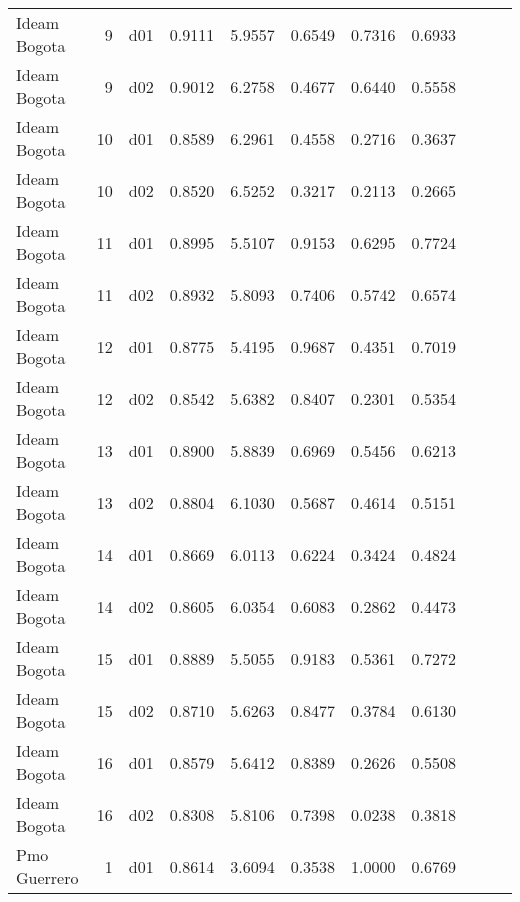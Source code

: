\begin{landscape}
\begin{longtable}{p{2cm}rrrrrrrrrr}
            Ideam Bogota  &          9 &     d01 &   0.9111 &  5.9557 &        0.6549 &           0.7316 &  0.6933 \\
            Ideam Bogota  &          9 &     d02 &   0.9012 &  6.2758 &        0.4677 &           0.6440 &  0.5558 \\
            Ideam Bogota  &         10 &     d01 &   0.8589 &  6.2961 &        0.4558 &           0.2716 &  0.3637 \\
            Ideam Bogota  &         10 &     d02 &   0.8520 &  6.5252 &        0.3217 &           0.2113 &  0.2665 \\
            Ideam Bogota  &         11 &     d01 &   0.8995 &  5.5107 &        0.9153 &           0.6295 &  0.7724 \\
            Ideam Bogota  &         11 &     d02 &   0.8932 &  5.8093 &        0.7406 &           0.5742 &  0.6574 \\
            Ideam Bogota  &         12 &     d01 &   0.8775 &  5.4195 &        0.9687 &           0.4351 &  0.7019 \\
            Ideam Bogota  &         12 &     d02 &   0.8542 &  5.6382 &        0.8407 &           0.2301 &  0.5354 \\
            Ideam Bogota  &         13 &     d01 &   0.8900 &  5.8839 &        0.6969 &           0.5456 &  0.6213 \\
            Ideam Bogota  &         13 &     d02 &   0.8804 &  6.1030 &        0.5687 &           0.4614 &  0.5151 \\
            Ideam Bogota  &         14 &     d01 &   0.8669 &  6.0113 &        0.6224 &           0.3424 &  0.4824 \\
            Ideam Bogota  &         14 &     d02 &   0.8605 &  6.0354 &        0.6083 &           0.2862 &  0.4473 \\
            Ideam Bogota  &         15 &     d01 &   0.8889 &  5.5055 &        0.9183 &           0.5361 &  0.7272 \\
            Ideam Bogota  &         15 &     d02 &   0.8710 &  5.6263 &        0.8477 &           0.3784 &  0.6130 \\
            Ideam Bogota  &         16 &     d01 &   0.8579 &  5.6412 &        0.8389 &           0.2626 &  0.5508 \\
            Ideam Bogota  &         16 &     d02 &   0.8308 &  5.8106 &        0.7398 &           0.0238 &  0.3818 \\
            Pmo Guerrero  &          1 &     d01 &   0.8614 &  3.6094 &        0.3538 &           1.0000 &  0.6769 \\

\end{longtable}
\end{landscape}
